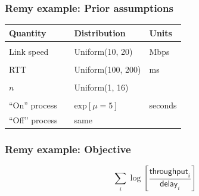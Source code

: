 \documentclass[svgnames]{beamer}
\begin{document}
\begin{frame}
\frametitle{Remy example: Prior assumptions}

\large

\begin{tabular}{llll}
\bf Quantity & & \bf Distribution & \bf Units \\

\hline \\

Link speed & & Uniform(10, 20) & Mbps \\

\\

RTT & & Uniform(100, 200) & ms \\

\\

$n$ & & Uniform(1, 16) \\

\\

``On'' process & & $\mathrm{exp}[\mu = 5]$ & seconds \\

``Off'' process & & same \\

\end{tabular}

\end{frame}

\begin{frame}
\frametitle{Remy example: Objective}

\LARGE

\[\sum_i \log \left[ \frac{\textsf{throughput}_i}{\textsf{delay}_i} \right]\]

\end{frame}


\end{document}
